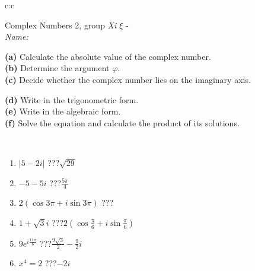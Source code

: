 \documentclass[10pt]{report}
\begin{document}
\newpage
\thispagestyle{empty}
\begin{tabular}{c:c}
\begin{minipage}[c][104.5mm][t]{0.5\linewidth}
\begin{center}
\vspace{5mm}
{\huge Complex Numbers 2, group \textit{Xi $\xi$} -}\\[5mm]
\textit{Name:}\phantom{xxxxxxxxxxxxxxxxxxxxxxxxxxxxxxxxxxxxxxxxxxxxxxxxxxxxxxxxxxxxxxxxx}\\[5mm]
\begin{minipage}{0.95\linewidth}
\begin{center}
{\small \begin{minipage}{0.44\textwidth} \raggedright
\textbf{(a)} Calculate the absolute value of the complex number. \\[1mm]
\textbf{(b)} Determine the argument \(\varphi\). \\[1mm]
\textbf{(c)} Decide whether the complex number lies on the imaginary axis. \end{minipage} \begin{minipage}{0.54\textwidth}
\textbf{(d)} Write in the trigonometric form. \\[1mm]
\textbf{(e)} Write in the algebraic form. \\[1mm]
\textbf{(f)} Solve the equation and calculate the product of its solutions.
\end{minipage}
}
\end{center}
\end{minipage}
\\[1mm]
\begin{minipage}{0.79\linewidth}
\begin{center}
\begin{varwidth}{\linewidth}
\setlength{\itemsep}{0pt}
\begin{enumerate}
\large
\item $|5-2i|$\quad \dotfill\; ???\;\dotfill \quad $\sqrt{29}$
\item $-5-5i$\quad \dotfill\; ???\;\dotfill \quad $\frac{5\pi}{4}$
\item $2\left(\cos{3\pi}+i\sin{3\pi}\right)$\quad \dotfill\; ???\;\dotfill \quad {}
\item $1+\sqrt{3}i$\quad \dotfill\; ???\;\dotfill \quad $2\left(\cos{\frac{\pi}{6}}+i\sin{\frac{\pi}{6}}\right)$
\item $9e^{i\frac{11\pi}{6}}$\quad \dotfill\; ???\;\dotfill \quad $\frac{9\sqrt{3}}{2}-\frac{9}{2}i$
\item $x^4=2$\quad \dotfill\; ???\;\dotfill \quad $-2i$

\end{enumerate}
\end{varwidth}
\end{center}
\end{minipage}
\end{center}
\end{minipage}
\end{tabular}
\end{document}
